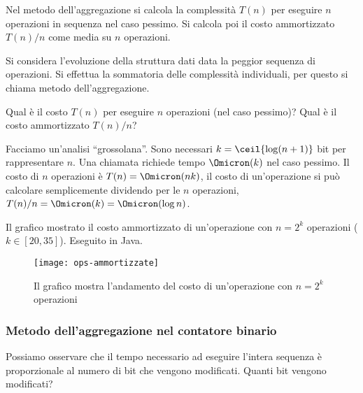 Nel metodo dell'aggregazione si calcola la complessità \(T(n)\) per eseguire \(n\) operazioni in sequenza nel caso pessimo.
Si calcola poi il costo ammortizzato \(T(n)/n\) come media su \(n\) operazioni.

Si considera l'evoluzione della struttura dati data la peggior sequenza di operazioni.
Si effettua la sommatoria delle complessità individuali, per questo si chiama metodo dell'aggregazione.

Qual è il costo \(T(n)\) per eseguire \(n\) operazioni (nel caso pessimo)?
Qual è il costo ammortizzato \(T(n)/n\)?

Facciamo un'analisi \enquote{grossolana}.
Sono necessari \(k = \ceil{\log(n+1)}\) bit per rappresentare \(n\).
Una chiamata \increment{} richiede tempo \(\Omicron(k)\) nel caso pessimo.
Il costo di \(n\) operazioni è \(T(n) = \Omicron(nk)\), il costo di un'operazione si può calcolare semplicemente dividendo per le \(n\) operazioni, \(T(n)/n = \Omicron(k) = \Omicron(\log n)\).

Il grafico mostrato il costo ammortizzato di un'operazione con \(n = 2^k\) operazioni (\(k \in [20, 35]\)).
Eseguito in Java.

\begin{figure}[!ht]\centering
    \texttt{[image: ops-ammortizzate]}
    \caption{Il grafico mostra l'andamento del costo di un'operazione con \(n = 2^k\) operazioni}\label{fig:ops-ammortizzate}
\end{figure}

\subsubsection{Metodo dell'aggregazione nel contatore binario}

Possiamo osservare che il tempo necessario ad eseguire l'intera sequenza è proporzionale al numero di bit che vengono modificati.
Quanti bit vengono modificati?

\newcommand{\diff}[1]{\textcolor{red}{\textbf{#1}}}


